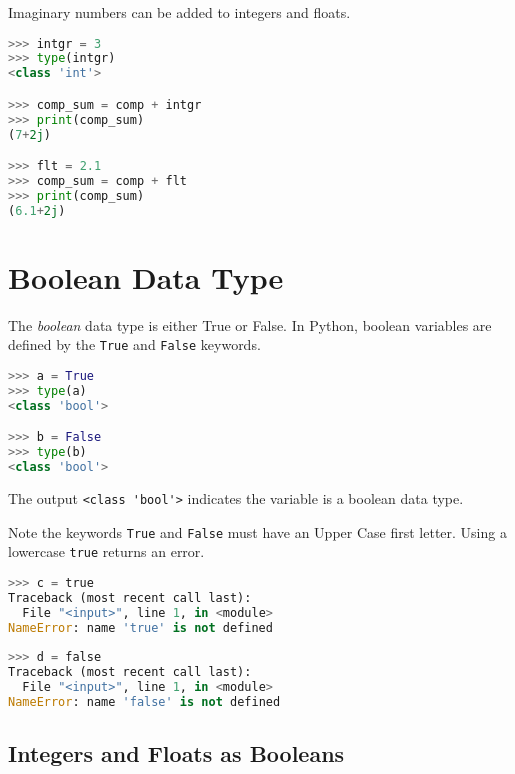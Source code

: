 \documentclass{book}
\newcommand{\passthrough}[1]{#1}
\begin{document}
Imaginary numbers can be added to integers and floats.

\begin{lstlisting}[language=Python]
>>> intgr = 3
>>> type(intgr)
<class 'int'>

>>> comp_sum = comp + intgr
>>> print(comp_sum)
(7+2j)

>>> flt = 2.1
>>> comp_sum = comp + flt
>>> print(comp_sum)
(6.1+2j)
\end{lstlisting}
    




    
        \hypertarget{boolean-data-type}{%
\section{Boolean Data Type}\label{boolean-data-type}}
    




    
        The \emph{boolean} data type is either True or False. In Python, boolean
variables are defined by the \passthrough{\lstinline!True!} and
\passthrough{\lstinline!False!} keywords.

\begin{lstlisting}[language=Python]
>>> a = True
>>> type(a)
<class 'bool'>

>>> b = False
>>> type(b)
<class 'bool'>
\end{lstlisting}

The output \passthrough{\lstinline!<class 'bool'>!} indicates the
variable is a boolean data type.

Note the keywords \passthrough{\lstinline!True!} and
\passthrough{\lstinline!False!} must have an Upper Case first letter.
Using a lowercase \passthrough{\lstinline!true!} returns an error.

\begin{lstlisting}[language=Python]
>>> c = true
Traceback (most recent call last):
  File "<input>", line 1, in <module>
NameError: name 'true' is not defined
   
>>> d = false
Traceback (most recent call last):
  File "<input>", line 1, in <module>
NameError: name 'false' is not defined
\end{lstlisting}
    




    
        \hypertarget{integers-and-floats-as-booleans}{%
\subsection{Integers and Floats as
Booleans}\label{integers-and-floats-as-booleans}}
\end{document}
